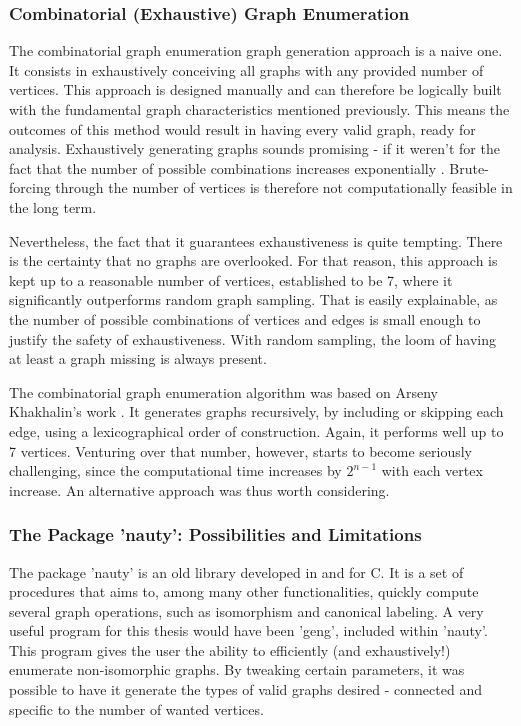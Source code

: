 \subsubsection{Combinatorial (Exhaustive) Graph Enumeration}
The combinatorial graph enumeration graph generation approach is a naive one. It consists in exhaustively conceiving all graphs with any provided number of vertices. This approach is designed manually and can therefore be logically built with the fundamental graph characteristics mentioned previously. This means the outcomes of this method would result in having every valid graph, ready for analysis. Exhaustively generating graphs sounds promising - if it weren't for the fact that the number of possible combinations increases exponentially \cite{oeisA001349}. Brute-forcing through the number of vertices is therefore not computationally feasible in the long term.

Nevertheless, the fact that it guarantees exhaustiveness is quite tempting. There is the certainty that no graphs are overlooked. For that reason, this approach is kept up to a reasonable number of vertices, established to be 7, where it significantly outperforms random graph sampling. That is easily explainable, as the number of possible combinations of vertices and edges is small enough to justify the safety of exhaustiveness. With random sampling, the loom of having at least a graph missing is always present.

The combinatorial graph enumeration algorithm was based on Arseny Khakhalin's work \cite{khakhalin2020}. It generates graphs recursively, by including or skipping each edge, using a lexicographical order of construction. Again, it performs well up to 7 vertices. Venturing over that number, however, starts to become seriously challenging, since the computational time increases by $2^{n-1}$ with each vertex increase. An alternative approach was thus worth considering.

\subsubsection{The Package 'nauty': Possibilities and Limitations}
The package 'nauty' is an old library developed in and for C. It is a set of procedures that aims to, among many other functionalities, quickly compute several graph operations, such as isomorphism and canonical labeling. A very useful program for this thesis would have been 'geng', included within 'nauty'. This program gives the user the ability to efficiently (and exhaustively!) enumerate non-isomorphic graphs. By tweaking certain parameters, it was possible to have it generate the types of valid graphs desired - connected and specific to the number of wanted vertices.

